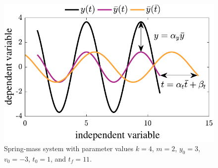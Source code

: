 \begin{figure}[t]
\centering
\includegraphics[width=0.5\columnwidth]{../ch4/figures/scaling_example}
\caption[Spring-mass system]{Spring-mass system with parameter values $k = 4$, $m = 2$, $y_0 = 3$, $v_0 = -3$, $t_0 = 1$, and $t_f = 11$. \label{fig:ch4:scaling_example}}
\end{figure}